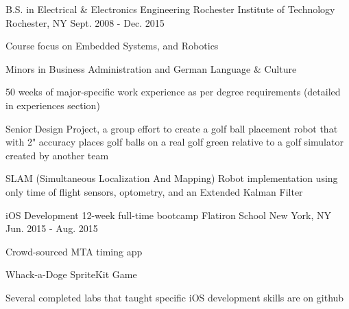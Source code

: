 
 \begin{cventries}
     \cventry
     {B.S. in Electrical \& Electronics Engineering} %
     {Rochester Institute of Technology} %
     {Rochester, NY} %
     {Sept. 2008 - Dec. 2015} %
     {\begin{cvitems} %
        \item {Course focus on Embedded Systems, and Robotics}
        \item {Minors in Business Administration and German Language \& Culture}
        \item {50 weeks of major-specific work experience as per degree          requirements (detailed in experiences section)}
        \item {Senior Design Project, a group effort to create a golf ball       placement robot that with 2" accuracy places golf balls on a real golf green relative to a golf simulator created by another team}
        \item {SLAM (Simultaneous Localization And Mapping) Robot                implementation using only time of flight sensors, optometry, and an Extended Kalman Filter}
        \end{cvitems}}
     \cventry
     {iOS Development 12-week full-time bootcamp}
     {Flatiron School}
     {New York, NY}
     {Jun. 2015 - Aug. 2015}
     {\begin{cvitems}
        \item{Crowd-sourced MTA timing app}
        \item{Whack-a-Doge SpriteKit Game}
        \item{Several completed labs that taught specific iOS development skills are on github}
        \end{cvitems}}
\end{cventries}
